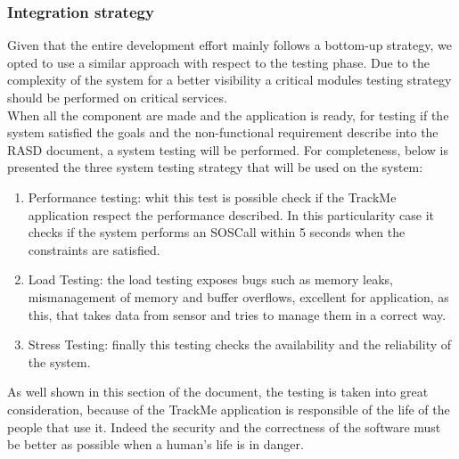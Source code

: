 \subsubsection{Integration strategy}
Given that the entire development effort mainly follows a bottom-up strategy, we opted to use a similar approach with respect to the testing phase. Due to the complexity of the system for a better visibility a critical modules testing strategy should be performed on critical services.\\
When all the component are made and the application is ready, for testing if the system satisfied the goals and the non-functional requirement describe into the RASD document, a system testing will be performed. For completeness, below is presented the three system testing strategy that will be used on the system: 
\begin{enumerate}
\item Performance testing: whit this test is possible check if the TrackMe application respect the performance described. In this particularity case it checks if the system performs an SOSCall within 5 seconds when the constraints are satisfied.
\item Load Testing: the load testing exposes bugs such as memory leaks, mismanagement of memory and buffer overflows, excellent for application, as this, that takes data from sensor and tries to manage them in a correct way.
\item Stress Testing: finally this testing checks the availability and the reliability of the system.
\end{enumerate}
As well shown in this section of the document, the testing is taken into great consideration, because of the TrackMe application is responsible of the life of the people that use it. Indeed the security and the correctness of the software must be better as possible when a human's life is in danger. 